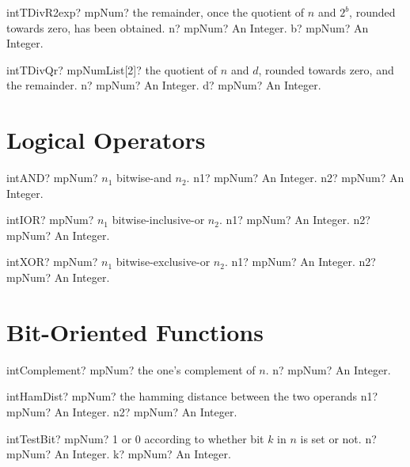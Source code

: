 \documentclass[12pt,a4paper,openany]{book}
\begin{document}
\begin{mpFunctionsExtract}
\mpFunctionTwo
{intTDivR2exp? mpNum? the remainder, once the quotient of $n$ and $2^b$, rounded towards zero, has been obtained.}
{n? mpNum? An Integer.}
{b? mpNum? An Integer.}
\end{mpFunctionsExtract}

\begin{mpFunctionsExtract}
\mpFunctionTwo
{intTDivQr? mpNumList[2]? the quotient of $n$ and $d$, rounded towards zero, and the remainder.}
{n? mpNum? An Integer.}
{d? mpNum? An Integer.}
\end{mpFunctionsExtract}

\section{Logical Operators }

\begin{mpFunctionsExtract}
\mpFunctionTwo
{intAND? mpNum? $n_1$ bitwise-and $n_2$.}
{n1? mpNum? An Integer.}
{n2? mpNum? An Integer.}
\end{mpFunctionsExtract}

\begin{mpFunctionsExtract}
\mpFunctionTwo
{intIOR? mpNum? $n_1$ bitwise-inclusive-or $n_2$.}
{n1? mpNum? An Integer.}
{n2? mpNum? An Integer.}
\end{mpFunctionsExtract}

\begin{mpFunctionsExtract}
\mpFunctionTwo
{intXOR? mpNum? $n_1$ bitwise-exclusive-or $n_2$.}
{n1? mpNum? An Integer.}
{n2? mpNum? An Integer.}
\end{mpFunctionsExtract}

\section{Bit-Oriented Functions}

\begin{mpFunctionsExtract}
\mpFunctionOne
{intComplement? mpNum? the one's complement of $n$.}
{n? mpNum? An Integer.}
\end{mpFunctionsExtract}

\begin{mpFunctionsExtract}
\mpFunctionTwo
{intHamDist? mpNum? the hamming distance between the two operands}
{n1? mpNum? An Integer.}
{n2? mpNum? An Integer.}
\end{mpFunctionsExtract}

\begin{mpFunctionsExtract}
\mpFunctionTwo
{intTestBit? mpNum? 1 or 0 according to whether bit $k$ in $n$ is set or not.}
{n? mpNum? An Integer.}
{k? mpNum? An Integer.}
\end{mpFunctionsExtract}
\end{document}
